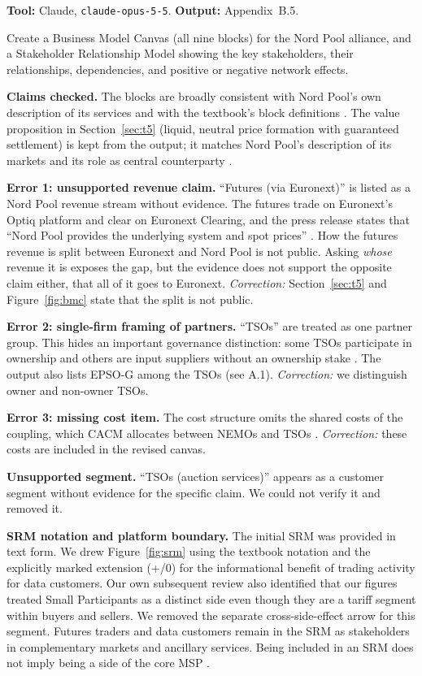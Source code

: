 \textbf{Tool:} Claude, \texttt{claude-opus-5-5}.
\quad \textbf{Output:} Appendix~B.5.

\begin{promptbox}
Create a Business Model Canvas (all nine blocks)
for the Nord Pool alliance, and a Stakeholder Relationship
Model showing the key stakeholders, their relationships,
dependencies, and positive or negative network effects.
\end{promptbox}

\textbf{Claims checked.}
The blocks are broadly consistent with Nord Pool's
own description of its services \citep{NPAbout}
and with the textbook's block definitions
\citep[Table~19.1]{OverbyAudestad2021}.
The value proposition in Section~\ref{sec:t5} (liquid,
neutral price formation with guaranteed settlement) is kept
from the output; it matches Nord Pool's description of its
markets and its role as central counterparty
\citep{NPAbout,NPClearing}.

\textbf{Error 1: unsupported revenue claim.}
``Futures (via Euronext)'' is listed as a Nord Pool
revenue stream without evidence.
The futures trade on Euronext's Optiq platform
and clear on Euronext Clearing, and the press release
states that ``Nord Pool provides the underlying system
and spot prices'' \citep{Euronext2026}.
How the futures revenue is split between Euronext
and Nord Pool is not public.
Asking \emph{whose} revenue it is exposes the gap,
but the evidence does not support the opposite claim
either, that all of it goes to Euronext.
\emph{Correction:} Section~\ref{sec:t5}
and Figure~\ref{fig:bmc}
state that the split is not public.

\textbf{Error 2: single-firm framing of partners.}
``TSOs'' are treated as one partner group.
This hides an important governance distinction:
some TSOs participate in ownership and others
are input suppliers without an ownership stake
\citep{EPSOG2022Completed}.
The output also lists EPSO-G among the TSOs
(see A.1).
\emph{Correction:} we distinguish owner
and non-owner TSOs.

\textbf{Error 3: missing cost item.}
The cost structure omits the shared costs
of the coupling, which CACM allocates
between NEMOs and TSOs \citep[Article~80]{CACM2015}.
\emph{Correction:} these costs are included
in the revised canvas.

\textbf{Unsupported segment.}
``TSOs (auction services)'' appears as a customer
segment without evidence for the specific claim.
We could not verify it and removed it.

\textbf{SRM notation and platform boundary.}
The initial SRM was provided in text form.
We drew Figure~\ref{fig:srm} using the textbook
notation and the explicitly marked extension (+/0)
for the informational benefit of trading activity
for data customers.
Our own subsequent review also identified that our figures
treated Small Participants as a distinct side
even though they are a tariff segment
within buyers and sellers.
We removed the separate cross-side-effect arrow
for this segment.
Futures traders and data customers remain
in the SRM as stakeholders in complementary markets
and ancillary services.
Being included in an SRM does not imply being a side
of the core MSP
\citep[Def.~10.1 and Section~19.3]{OverbyAudestad2021}.

